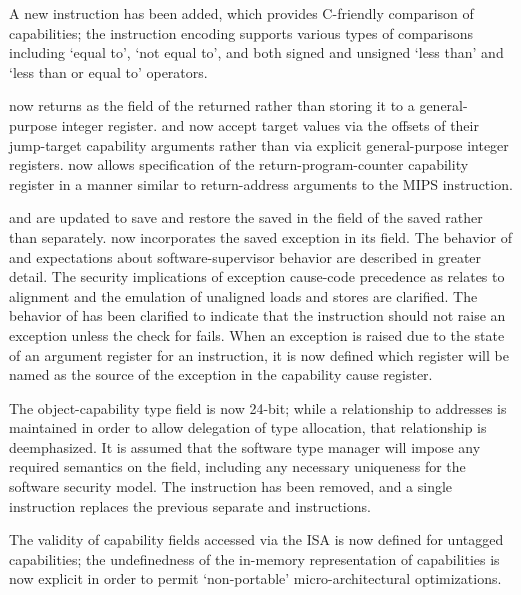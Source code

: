 \begin{description}
  A new  instruction has been added, which provides
  C-friendly
  comparison of capabilities; the instruction encoding supports various types
  of comparisons including `equal to', `not equal to', and both signed and
  unsigned `less than' and `less than or equal to' operators.

   now returns \PC{} as the \coffset{} field of the
  returned \PCC{} rather than storing it to a general-purpose integer register.
   and  now accept target \PC{} values
  via the offsets of their
  jump-target capability arguments rather than via explicit general-purpose
  integer registers.
   now allows specification of the return-program-counter
  capability register in a manner similar to return-address arguments to the
  MIPS  instruction.

   and  are updated to save and
  restore the saved \PC{} in the
  \coffset{} field of the saved \EPCC{} rather than separately.
  \EPCC{} now incorporates the saved exception \PC{} in its \coffset{} field.
  The behavior of \EPCC{} and expectations about software-supervisor behavior
  are described in greater detail.
  The security implications of exception cause-code precedence as relates to
  alignment and the emulation of unaligned loads and stores are clarified.
  The behavior of  has been clarified to indicate
  that the instruction should not raise an exception unless the check for
   fails.
  When an exception is raised due to the state of an argument register for
  an instruction, it is now defined which register will be named as the source
  of the exception in the capability cause register.

  The object-capability type field is now 24-bit; while a relationship to
  addresses is maintained in order to allow delegation of type allocation,
  that relationship is deemphasized.
  It is assumed that the software type manager will impose any required
  semantics on the field, including any necessary uniqueness for the software
  security model.
  The  instruction has been removed, and a single
   instruction
  replaces the previous separate  and
   instructions.

  The validity of capability fields accessed via the ISA is now defined for
  untagged capabilities; the undefinedness of the in-memory representation of
  capabilities is now explicit in order to permit `non-portable'
  micro-architectural optimizations.


\end{description}
